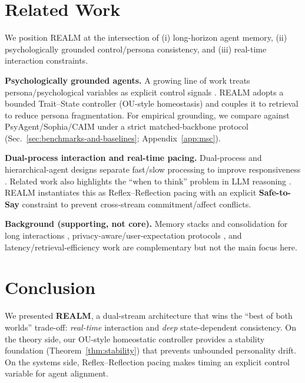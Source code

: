 \documentclass{article}
\begin{document}
\section{Related Work}
\label{sec:related-work}

We position REALM at the intersection of (i) long-horizon agent memory, (ii) psychologically grounded control/persona consistency, and (iii) real-time interaction constraints.

\textbf{Psychologically grounded agents.}
A growing line of work treats persona/psychological variables as explicit control signals \cite{park2023generative,li2023camel,personaforge2026,zhang2025personaagent,zeng2025dynamicpersonality,shanahan2023roleplay,sun2024clarion}. REALM adopts a bounded Trait--State controller (OU-style homeostasis) and couples it to retrieval to reduce persona fragmentation.
For empirical grounding, we compare against PsyAgent/Sophia/CAIM under a strict matched-backbone protocol (Sec.~\ref{sec:benchmarks-and-baselines}; Appendix~\ref{app:msc}).

\textbf{Dual-process interaction and real-time pacing.}
Dual-process and hierarchical-agent designs separate fast/slow processing to improve responsiveness \cite{zhang2025dptagent,liu2023hierarchicalagent,liu2024coordination,lin2024estuary,tian2023duma}. Related work also highlights the ``when to think'' problem in LLM reasoning \cite{pandian2025snapout}. REALM instantiates this as Reflex--Reflection pacing with an explicit \textbf{Safe-to-Say} constraint to prevent cross-stream commitment/affect conflicts.

\textbf{Background (supporting, not core).}
Memory stacks and consolidation for long interactions \cite{packer2023memgpt,zhao2026inside,timem2025,himem2025,aeon2025,an2025cognitiveworkspace,liu2024raise}, privacy-aware/user-expectation protocols \cite{alqithami2025mars,jones2024userexpectations}, and latency/retrieval-efficiency work \cite{lin2025agentinfer,tian2026swiftmem,su2026temporalsemanticmemory} are complementary but not the main focus here.

\section{Conclusion}

We presented \textbf{REALM}, a dual-stream architecture that wins the ``best of both worlds'' trade-off: \emph{real-time} interaction and \emph{deep} state-dependent consistency.
On the theory side, our OU-style homeostatic controller provides a stability foundation (Theorem~\ref{thm:stability}) that prevents unbounded personality drift.
On the systems side, Reflex--Reflection pacing makes timing an explicit control variable for agent alignment.
\end{document}
